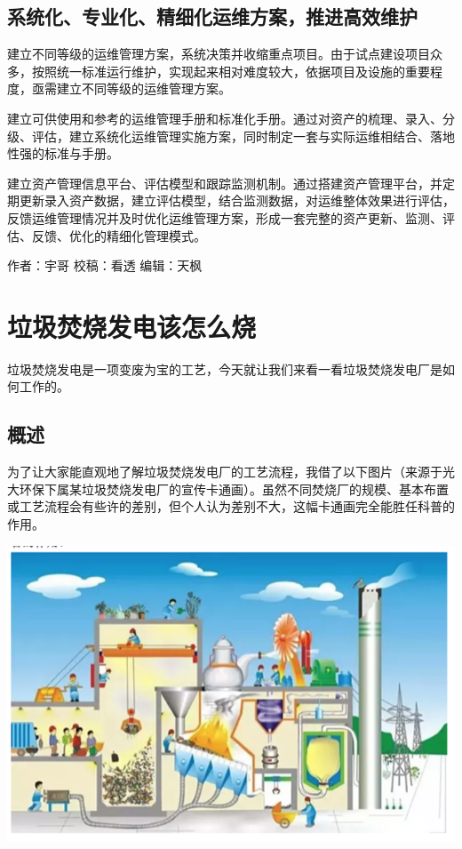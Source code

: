 \documentclass[]{book}
\begin{document}
\hypertarget{ux7cfbux7edfux5316ux4e13ux4e1aux5316ux7cbeux7ec6ux5316ux8fd0ux7ef4ux65b9ux6848ux63a8ux8fdbux9ad8ux6548ux7ef4ux62a4}{%
\subsection{系统化、专业化、精细化运维方案，推进高效维护}\label{ux7cfbux7edfux5316ux4e13ux4e1aux5316ux7cbeux7ec6ux5316ux8fd0ux7ef4ux65b9ux6848ux63a8ux8fdbux9ad8ux6548ux7ef4ux62a4}}

建立不同等级的运维管理方案，系统决策并收缩重点项目。由于试点建设项目众多，按照统一标准运行维护，实现起来相对难度较大，依据项目及设施的重要程度，亟需建立不同等级的运维管理方案。

建立可供使用和参考的运维管理手册和标准化手册。通过对资产的梳理、录入、分级、评估，建立系统化运维管理实施方案，同时制定一套与实际运维相结合、落地性强的标准与手册。

建立资产管理信息平台、评估模型和跟踪监测机制。通过搭建资产管理平台，并定期更新录入资产数据，建立评估模型，结合监测数据，对运维整体效果进行评估，反馈运维管理情况并及时优化运维管理方案，形成一套完整的资产更新、监测、评估、反馈、优化的精细化管理模式。

作者：宇哥
校稿：看透
编辑：天枫

\hypertarget{ux5783ux573eux711aux70e7ux53d1ux7535ux8be5ux600eux4e48ux70e7}{%
\section{垃圾焚烧发电该怎么烧}\label{ux5783ux573eux711aux70e7ux53d1ux7535ux8be5ux600eux4e48ux70e7}}

垃圾焚烧发电是一项变废为宝的工艺，今天就让我们来看一看垃圾焚烧发电厂是如何工作的。

\hypertarget{ux6982ux8ff0}{%
\subsection{概述}\label{ux6982ux8ff0}}

为了让大家能直观地了解垃圾焚烧发电厂的工艺流程，我借了以下图片（来源于光大环保下属某垃圾焚烧发电厂的宣传卡通画）。虽然不同焚烧厂的规模、基本布置或工艺流程会有些许的差别，但个人认为差别不大，这幅卡通画完全能胜任科普的作用。

\includegraphics[width=8.33in]{images/ljfs1}
\end{document}

